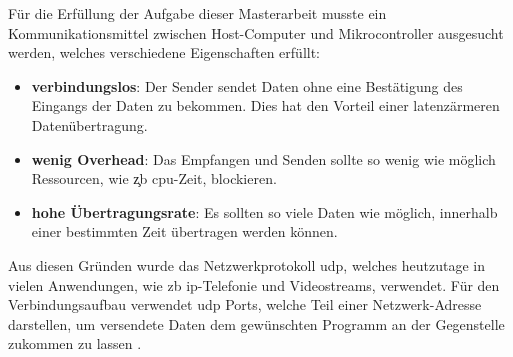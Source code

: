 \documentclass[../EDF Master Thesis.tex]{subfiles}
\begin{document}
    Für die Erfüllung der Aufgabe dieser Masterarbeit musste ein Kommunikationsmittel zwischen Host-Computer und Mikrocontroller ausgesucht werden, welches verschiedene Eigenschaften erfüllt:
    \begin{itemize}
        \item \textbf{verbindungslos}: Der Sender sendet Daten ohne eine Bestätigung des Eingangs der Daten zu bekommen.
                                       Dies hat den Vorteil einer latenzärmeren Datenübertragung.
        \item \textbf{wenig Overhead}: Das Empfangen und Senden sollte so wenig wie möglich Ressourcen, wie \c{zb} \ac{cpu}-Zeit, blockieren.
        \item \textbf{hohe Übertragungsrate}: Es sollten so viele Daten wie möglich, innerhalb einer bestimmten Zeit übertragen werden können.
    \end{itemize}

    Aus diesen Gründen wurde das Netzwerkprotokoll \ac{udp}, welches heutzutage in vielen Anwendungen, wie \ac{zb} \ac{ip}-Telefonie und Videostreams, verwendet.
    Für den Verbindungsaufbau verwendet \ac{udp} Ports, welche Teil einer Netzwerk-Adresse darstellen, um versendete Daten dem gewünschten Programm an der Gegenstelle zukommen zu lassen \parencite{wiki:009}.
\end{document}
